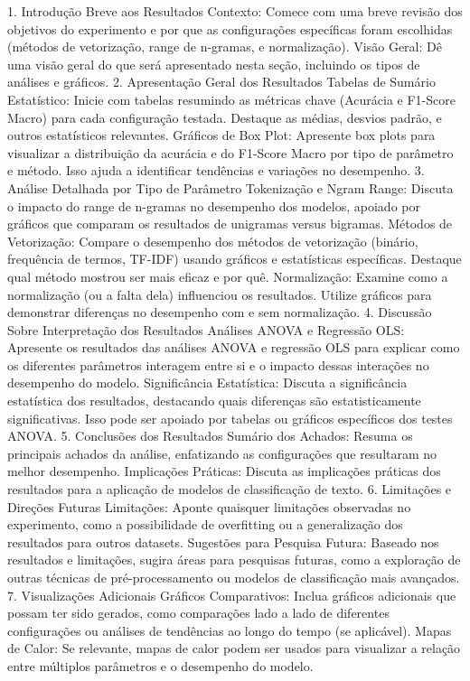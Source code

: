 1. Introdução Breve aos Resultados
Contexto: Comece com uma breve revisão dos objetivos do experimento e por que as configurações específicas foram escolhidas (métodos de vetorização, range de n-gramas, e normalização).
Visão Geral: Dê uma visão geral do que será apresentado nesta seção, incluindo os tipos de análises e gráficos.
2. Apresentação Geral dos Resultados
Tabelas de Sumário Estatístico: Inicie com tabelas resumindo as métricas chave (Acurácia e F1-Score Macro) para cada configuração testada. Destaque as médias, desvios padrão, e outros estatísticos relevantes.
Gráficos de Box Plot: Apresente box plots para visualizar a distribuição da acurácia e do F1-Score Macro por tipo de parâmetro e método. Isso ajuda a identificar tendências e variações no desempenho.
3. Análise Detalhada por Tipo de Parâmetro
Tokenização e Ngram Range: Discuta o impacto do range de n-gramas no desempenho dos modelos, apoiado por gráficos que comparam os resultados de unigramas versus bigramas.
Métodos de Vetorização: Compare o desempenho dos métodos de vetorização (binário, frequência de termos, TF-IDF) usando gráficos e estatísticas específicas. Destaque qual método mostrou ser mais eficaz e por quê.
Normalização: Examine como a normalização (ou a falta dela) influenciou os resultados. Utilize gráficos para demonstrar diferenças no desempenho com e sem normalização.
4. Discussão Sobre Interpretação dos Resultados
Análises ANOVA e Regressão OLS: Apresente os resultados das análises ANOVA e regressão OLS para explicar como os diferentes parâmetros interagem entre si e o impacto dessas interações no desempenho do modelo.
Significância Estatística: Discuta a significância estatística dos resultados, destacando quais diferenças são estatisticamente significativas. Isso pode ser apoiado por tabelas ou gráficos específicos dos testes ANOVA.
5. Conclusões dos Resultados
Sumário dos Achados: Resuma os principais achados da análise, enfatizando as configurações que resultaram no melhor desempenho.
Implicações Práticas: Discuta as implicações práticas dos resultados para a aplicação de modelos de classificação de texto.
6. Limitações e Direções Futuras
Limitações: Aponte quaisquer limitações observadas no experimento, como a possibilidade de overfitting ou a generalização dos resultados para outros datasets.
Sugestões para Pesquisa Futura: Baseado nos resultados e limitações, sugira áreas para pesquisas futuras, como a exploração de outras técnicas de pré-processamento ou modelos de classificação mais avançados.
7. Visualizações Adicionais
Gráficos Comparativos: Inclua gráficos adicionais que possam ter sido gerados, como comparações lado a lado de diferentes configurações ou análises de tendências ao longo do tempo (se aplicável).
Mapas de Calor: Se relevante, mapas de calor podem ser usados para visualizar a relação entre múltiplos parâmetros e o desempenho do modelo.

